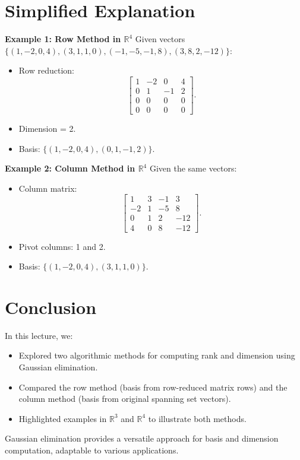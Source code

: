 \documentclass{article}
\begin{document}
\section*{Simplified Explanation}

\textbf{Example 1: Row Method in $\mathbb{R}^4$}
Given vectors $\{(1, -2, 0, 4), (3, 1, 1, 0), (-1, -5, -1, 8), (3, 8, 2, -12)\}$:
\begin{itemize}
  \item Row reduction:
    \[
      \begin{bmatrix}
        1 & -2 & 0 & 4 \\
        0 & 1 & -1 & 2 \\
        0 & 0 & 0 & 0 \\
        0 & 0 & 0 & 0
      \end{bmatrix}.
    \]
  \item Dimension = 2.
  \item Basis: $\{(1, -2, 0, 4), (0, 1, -1, 2)\}$.
\end{itemize}

\textbf{Example 2: Column Method in $\mathbb{R}^4$}
Given the same vectors:
\begin{itemize}
  \item Column matrix:
    \[
      \begin{bmatrix}
        1 & 3 & -1 & 3 \\
        -2 & 1 & -5 & 8 \\
        0 & 1 & 2 & -12 \\
        4 & 0 & 8 & -12
      \end{bmatrix}.
    \]
  \item Pivot columns: 1 and 2.
  \item Basis: $\{(1, -2, 0, 4), (3, 1, 1, 0)\}$.
\end{itemize}

\section*{Conclusion}

In this lecture, we:
\begin{itemize}
  \item Explored two algorithmic methods for computing rank and dimension using Gaussian elimination.
  \item Compared the row method (basis from row-reduced matrix rows) and the column method (basis from original spanning set vectors).
  \item Highlighted examples in $\mathbb{R}^3$ and $\mathbb{R}^4$ to illustrate both methods.
\end{itemize}

Gaussian elimination provides a versatile approach for basis and dimension computation, adaptable to various applications.
\end{document}
